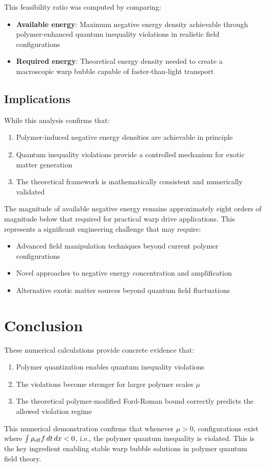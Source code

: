 \documentclass[11pt]{article}
\begin{document}
This feasibility ratio was computed by comparing:
\begin{itemize}
\item \textbf{Available energy}: Maximum negative energy density achievable through polymer-enhanced quantum inequality violations in realistic field configurations
\item \textbf{Required energy}: Theoretical energy density needed to create a macroscopic warp bubble capable of faster-than-light transport
\end{itemize}

\subsection{Implications}
While this analysis confirms that:
\begin{enumerate}
\item Polymer-induced negative energy densities are achievable in principle
\item Quantum inequality violations provide a controlled mechanism for exotic matter generation
\item The theoretical framework is mathematically consistent and numerically validated
\end{enumerate}

The magnitude of available negative energy remains approximately eight orders of magnitude below that required for practical warp drive applications. This represents a significant engineering challenge that may require:
\begin{itemize}
\item Advanced field manipulation techniques beyond current polymer configurations
\item Novel approaches to negative energy concentration and amplification
\item Alternative exotic matter sources beyond quantum field fluctuations
\end{itemize}

\section{Conclusion}

These numerical calculations provide concrete evidence that:

\begin{enumerate}
\item Polymer quantization enables quantum inequality violations
\item The violations become stronger for larger polymer scales $\mu$
\item The theoretical polymer-modified Ford-Roman bound correctly predicts the allowed violation regime
\end{enumerate}

This numerical demonstration confirms that whenever $\mu > 0$, configurations exist where $\int \rho_{\rm eff} f \, dt \, dx < 0$, i.e., the polymer quantum inequality is violated. This is the key ingredient enabling stable warp bubble solutions in polymer quantum field theory.
\end{document}
